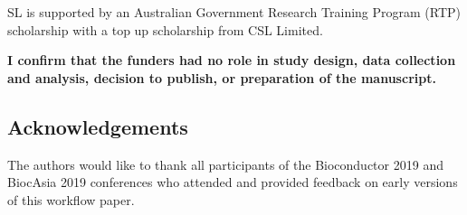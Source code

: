 \documentclass[
  9pt,
  a4paper,
]{extarticle}
\begin{document}
SL is supported by an Australian Government Research Training Program (RTP)
scholarship with a top up scholarship from CSL Limited.

\textbf{I confirm that the funders had no role in study design, data collection and
analysis, decision to publish, or preparation of the manuscript.}

\hypertarget{acknowledgements}{%
\subsection{Acknowledgements}\label{acknowledgements}}

The authors would like to thank all participants of the Bioconductor 2019 and
BiocAsia 2019 conferences who attended and provided feedback on early versions
of this workflow paper.

\renewcommand\refname{References}
  
\end{document}
